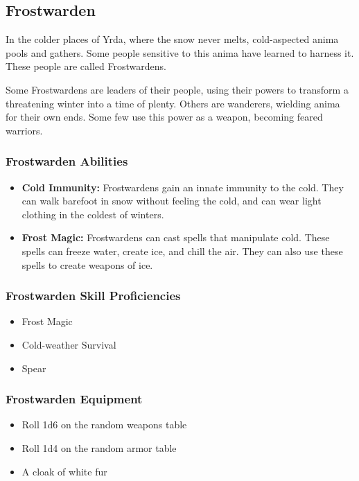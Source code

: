 \begin{multicols}{2}
\subsection{Frostwarden}

In the colder places of Yrda, where the snow never melts, cold-aspected
anima pools and gathers. Some people sensitive to this anima have learned
to harness it. These people are called Frostwardens.

Some Frostwardens are leaders of their people, using their powers to
transform a threatening winter into a time of plenty. Others are
wanderers, wielding anima for their own ends. Some few use this power
as a weapon, becoming feared warriors.

\subsubsection{Frostwarden Abilities}

\begin{itemize}
  \item \textbf{Cold Immunity:} Frostwardens gain an innate immunity to the cold. They
    can walk barefoot in snow without feeling the cold, and can wear light clothing
    in the coldest of winters.
  \item \textbf{Frost Magic:} Frostwardens can cast spells that manipulate cold. These
    spells can freeze water, create ice, and chill the air. They can also use these
    spells to create weapons of ice.
\end{itemize}

\subsubsection{Frostwarden Skill Proficiencies}

\begin{itemize}
  \item Frost Magic
  \item Cold-weather Survival
  \item Spear
\end{itemize}

\subsubsection{Frostwarden Equipment}

\begin{itemize}
  \item Roll 1d6 on the random weapons table
  \item Roll 1d4 on the random armor table
  \item A cloak of white fur
\end{itemize}


\end{multicols}
